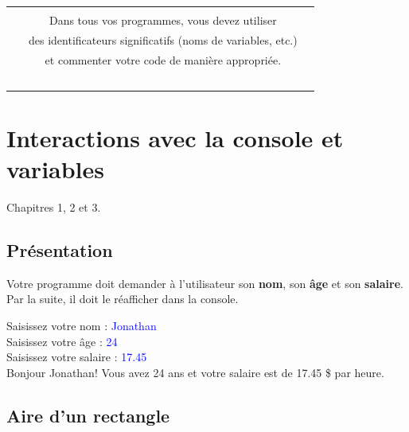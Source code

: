 \documentclass[12pt]{article}
\newenvironment{console}
	{
	\tcolorbox[title={Sortie console}, sharp corners = south, boxsep = 1.5mm]{} \tt
	}{\endtcolorbox}
\begin{document}

\begin{center}
\begin{tabular}{c c c}
\hline \\
\quad & Dans tous vos programmes, vous devez utiliser & \quad \\
& des identificateurs significatifs (noms de variables, etc.)\\
& et commenter votre code de manière appropriée.\\
\ \\
\hline
\end{tabular}
\end{center}




%
%

\section{Interactions avec la console et variables}
\vspace*{-\baselineskip}
Chapitres 1, 2 et 3.

%
%
%

\subsection{Présentation}

Votre programme doit demander à l'utilisateur son \textbf{nom}, son \textbf{âge} et son \textbf{salaire}. Par la suite, il doit le réafficher dans la console.
 
\begin{console}
Saisissez votre nom : \textcolor{blue}{Jonathan}\\
Saisissez votre âge : \textcolor{blue}{24}\\
Saisissez votre salaire : \textcolor{blue}{17.45}\\[\baselineskip]
Bonjour Jonathan! Vous avez 24 ans et votre salaire est de 17.45 \$ par heure.
\end{console}




\subsection{Aire d'un rectangle}
\end{document}
